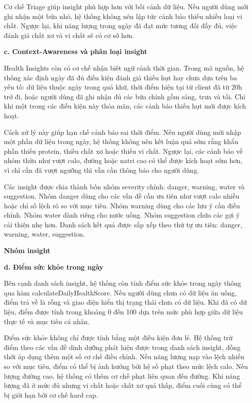 \documentclass[12pt, a4paper]{report}
\begin{document}
Cơ chế Triage giúp insight phù hợp hơn với bối cảnh dữ liệu. Nếu người dùng mới ghi nhận một bữa nhỏ, hệ thống không nên lập tức cảnh báo thiếu nhiều loại vi chất. Ngược lại, khi năng lượng trong ngày đã đạt mức tương đối đầy đủ, việc đánh giá chất xơ và vi chất sẽ có cơ sở hơn.

\textbf{c. Context-Awareness và phân loại insight}

Health Insights còn có cơ chế nhận biết ngữ cảnh thời gian. Trong mã nguồn, hệ thống xác định ngày đã đủ điều kiện đánh giá thiếu hụt hay chưa dựa trên ba yếu tố: dữ liệu thuộc ngày trong quá khứ, thời điểm hiện tại từ client đã từ 20h trở đi, hoặc người dùng đã ghi nhận đủ các bữa chính gồm sáng, trưa và tối. Chỉ khi một trong các điều kiện này thỏa mãn, các cảnh báo thiếu hụt mới được kích hoạt.

Cách xử lý này giúp hạn chế cảnh báo sai thời điểm. Nếu người dùng mới nhập một phần dữ liệu trong ngày, hệ thống không nên kết luận quá sớm rằng khẩu phần thiếu protein, thiếu chất xơ hoặc thiếu vi chất. Ngược lại, các cảnh báo về nhóm thừa như vượt calo, đường hoặc natri cao có thể được kích hoạt sớm hơn, vì chỉ cần đã vượt ngưỡng thì vẫn cần thông báo cho người dùng.

Các insight được chia thành bốn nhóm severity chính: danger, warning, water và suggestion. Nhóm danger dùng cho các vấn đề cần ưu tiên như vượt calo nhiều hoặc chỉ số lệch rõ so với mục tiêu. Nhóm warning dùng cho các lưu ý cần điều chỉnh. Nhóm water dành riêng cho nước uống. Nhóm suggestion chứa các gợi ý cải thiện nhẹ hơn. Danh sách kết quả được sắp xếp theo thứ tự ưu tiên: danger, warning, water, suggestion.

\textbf{Nhóm insight}

\textbf{d. Điểm sức khỏe trong ngày}

Bên cạnh danh sách insight, hệ thống còn tính điểm sức khỏe trong ngày thông qua hàm calculateDailyHealthScore. Nếu người dùng chưa có dữ liệu ăn uống, điểm trả về là rỗng và giao diện hiển thị trạng thái chưa có dữ liệu. Khi đã có dữ liệu, điểm được tính trong khoảng 0 đến 100 dựa trên mức phù hợp giữa dữ liệu thực tế và mục tiêu cá nhân.

Điểm sức khỏe không chỉ được tính bằng một điều kiện đơn lẻ. Hệ thống trừ điểm theo các vấn đề dinh dưỡng phát hiện được trong danh sách insight, đồng thời áp dụng thêm một số cơ chế điều chỉnh. Nếu năng lượng nạp vào lệch nhiều so với mục tiêu, điểm có thể bị ảnh hưởng bởi hệ số phạt theo mức lệch calo. Nếu lượng đường cao, hệ thống có thêm cơ chế phạt liên quan đến đường. Khi năng lượng đã ở mức đủ nhưng vi chất hoặc chất xơ quá thấp, điểm cuối cùng có thể bị giới hạn bởi cơ chế hard cap.
\end{document}
